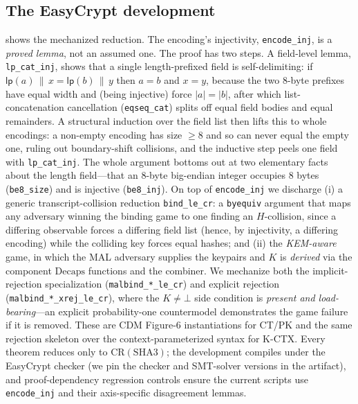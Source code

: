 \documentclass[journal]{IEEEtran}
\newcommand{\code}[1]{\texttt{\small #1}}
\newcommand{\K}{\ensuremath{K}}
\begin{document}
\subsection{The EasyCrypt development}
 shows the mechanized reduction. The encoding's injectivity, \code{encode\_inj},
is a \emph{proved lemma}, not an assumed one. The proof has two steps. A field-level lemma,
\code{lp\_cat\_inj}, shows that a single length-prefixed field is self-delimiting: if
$\mathsf{lp}(a)\,\|\,x = \mathsf{lp}(b)\,\|\,y$ then $a=b$ and $x=y$, because the two 8-byte
prefixes have equal width and (being injective) force $|a|=|b|$, after which list-concatenation
cancellation (\code{eqseq\_cat}) splits off equal field bodies and equal remainders. A structural
induction over the field list then lifts this to whole encodings: a non-empty encoding has size
$\ge 8$ and so can never equal the empty one, ruling out boundary-shift collisions, and the
inductive step peels one field with \code{lp\_cat\_inj}. The whole argument bottoms out at two
elementary facts about the length field---that an 8-byte big-endian integer occupies 8 bytes
(\code{be8\_size}) and is injective (\code{be8\_inj}). On top of \code{encode\_inj} we discharge (i)
a generic transcript-collision reduction \code{bind\_le\_cr}: a \code{byequiv} argument that maps any
adversary winning the binding game to one finding an $H$-collision, since a differing observable
forces a differing field list (hence, by injectivity, a differing encoding) while the colliding key
forces equal hashes; and (ii) the \emph{KEM-aware} game, in which
the MAL adversary supplies the keypairs and \K{} is \emph{derived} via the component
$\mathrm{Decaps}$ functions and the combiner. We mechanize both the implicit-rejection
specialization (\code{malbind\_*\_le\_cr}) and explicit rejection
(\code{malbind\_*\_xrej\_le\_cr}), where the $\K\neq\bot$ side condition is
\emph{present and load-bearing}---an explicit probability-one countermodel demonstrates the game
failure if it is removed. These are CDM Figure-6 instantiations for CT/PK and the same rejection
skeleton over the context-parameterized syntax for K-CTX. Every theorem reduces only to
$\mathrm{CR}(\mathrm{SHA3})$; the development compiles under the EasyCrypt checker (we pin the
checker and SMT-solver versions in the artifact), and proof-dependency regression controls ensure
the current scripts use \code{encode\_inj} and their axis-specific disagreement lemmas.
\end{document}
